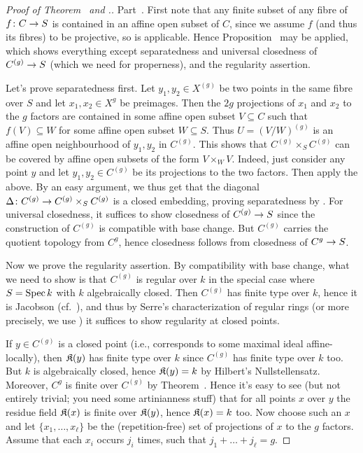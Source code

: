 \documentclass[a4paper,parskip=half,numbers=enddot, DIV=12]{scrreprt}
\begin{document}
\begin{proof}[Proof of Theorem~ and .]
	Part~. First note that any finite subset of any fibre of $f\colon C\morphism S$ is contained in an affine open subset of $C$, since we assume $f$ (and thus its fibres) to be projective, so \cite[Proposition~2.2.1]{alggeo2} is applicable. Hence Proposition~ may be applied, which shows everything except separatedness and universal closedness of $C^{(g)}\morphism S$ (which we need for properness), and the regularity assertion. 
	
	Let's prove separatedness first. Let $y_1,y_2\in X^{(g)}$ be two points in the same fibre over $S$ and let $x_1,x_2\in X^g$ be preimages. Then the $2g$ projections of $x_1$ and $x_2$ to the $g$ factors are contained in some affine open subset $V\subseteq C$ such that $f(V)\subseteq W$ for some affine open subset $W\subseteq S$. Thus $U=(V/W)^{(g)}$ is an affine open neighbourhood of $y_1, y_2$ in $C^{(g)}$. This shows that $C^{(g)}\times_SC^{(g)}$ can be covered by affine open subsets of the form $V\times_WV$. Indeed, just consider any point $y$ and let $y_1,y_2\in C^{(g)}$ be its projections to the two factors. Then apply the above. By an easy argument, we thus get that the diagonal $\Delta\colon C^{(g)}\morphism C^{(g)}\times_SC^{(g)}$ is a closed embedding, proving separatedness by \cite[Fact~1.5.7]{alggeo1}. For universal closedness, it suffices to show closedness of $C^{(g)}\morphism S$ since the construction of $C^{(g)}$ is compatible with base change. But $C^{(g)}$ carries the quotient topology from $C^g$, hence closedness follows from closedness of $C^g\morphism S$.
	
	Now we prove the regularity assertion. By compatibility with base change, what we need to show is that $C^{(g)}$ is regular over $k$ in the special case where $S=\operatorname{Spec} k$ with $k$ algebraically closed. Then $C^{(g)}$ has finite type over $k$, hence it is Jacobson (cf.\ \cite[Definition~2.4.2]{alggeo1}), and thus by Serre's characterization of regular rings (or more precisely, we use \cite[Corollary~2.2.1]{homalg}) it suffices to show regularity at closed points.
	
	If $y\in C^{(g)}$ is a closed point (i.e., corresponds to some maximal ideal affine-locally), then $\mathfrak{K}(y)$ has finite type over $k$ since $C^{(g)}$ has finite type over $k$ too. But $k$ is algebraically closed, hence $\mathfrak{K}(y)=k$ by Hilbert's Nullstellensatz. Moreover, $C^g$ is finite over $C^{(g)}$ by Theorem~. Hence it's easy to see (but not entirely trivial; you need some artinianness stuff) that for all points $x$ over $y$ the residue field $\mathfrak{K}(x)$ is finite over $\mathfrak{K}(y)$, hence $\mathfrak{K}(x)=k$ too. Now choose such an $x$ and let $\{x_1,\ldots,x_\ell\}$ be the (repetition-free) set of projections of $x$ to the $g$ factors. Assume that each $x_i$ occurs $j_i$ times, such that $j_1+\ldots+j_\ell=g$.
	

\end{proof}
\end{document}
